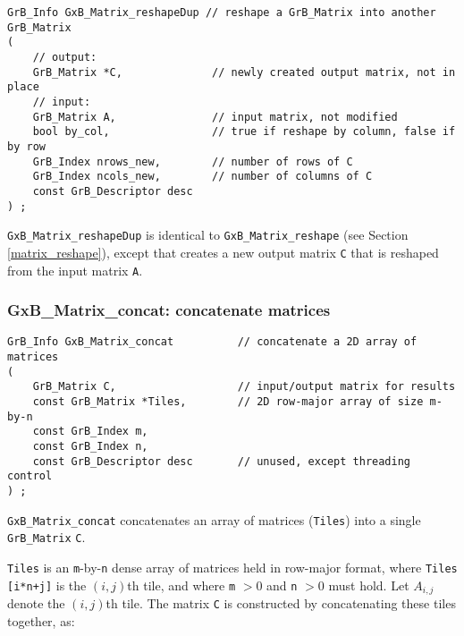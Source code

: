 \documentclass[12pt]{article}
\begin{document}
\begin{mdframed}[userdefinedwidth=6in]
{\footnotesize
\begin{verbatim}
GrB_Info GxB_Matrix_reshapeDup // reshape a GrB_Matrix into another GrB_Matrix
(
    // output:
    GrB_Matrix *C,              // newly created output matrix, not in place
    // input:
    GrB_Matrix A,               // input matrix, not modified
    bool by_col,                // true if reshape by column, false if by row
    GrB_Index nrows_new,        // number of rows of C
    GrB_Index ncols_new,        // number of columns of C
    const GrB_Descriptor desc
) ;
\end{verbatim} } \end{mdframed}

\verb'GxB_Matrix_reshapeDup' is identical to \verb'GxB_Matrix_reshape' (see
Section \ref{matrix_reshape}), except that creates a new output matrix
\verb'C' that is reshaped from the input matrix \verb'A'.

\subsubsection{{\sf GxB\_Matrix\_concat:} concatenate matrices   }
\label{matrix_concat}

\begin{mdframed}[userdefinedwidth=6in]
{\footnotesize
\begin{verbatim}
GrB_Info GxB_Matrix_concat          // concatenate a 2D array of matrices
(
    GrB_Matrix C,                   // input/output matrix for results
    const GrB_Matrix *Tiles,        // 2D row-major array of size m-by-n
    const GrB_Index m,
    const GrB_Index n,
    const GrB_Descriptor desc       // unused, except threading control
) ;
\end{verbatim} } \end{mdframed}

\verb'GxB_Matrix_concat' concatenates an array of matrices (\verb'Tiles') into
a single \verb'GrB_Matrix' \verb'C'.

\verb'Tiles' is an \verb'm'-by-\verb'n' dense array of matrices held in
row-major format, where \verb'Tiles [i*n+j]' is the $(i,j)$th tile, and where
\verb'm' $> 0$ and \verb'n' $> 0$ must hold.  Let $A_{i,j}$ denote the
$(i,j)$th tile.  The matrix \verb'C' is constructed by concatenating these
tiles together, as:
\end{document}
